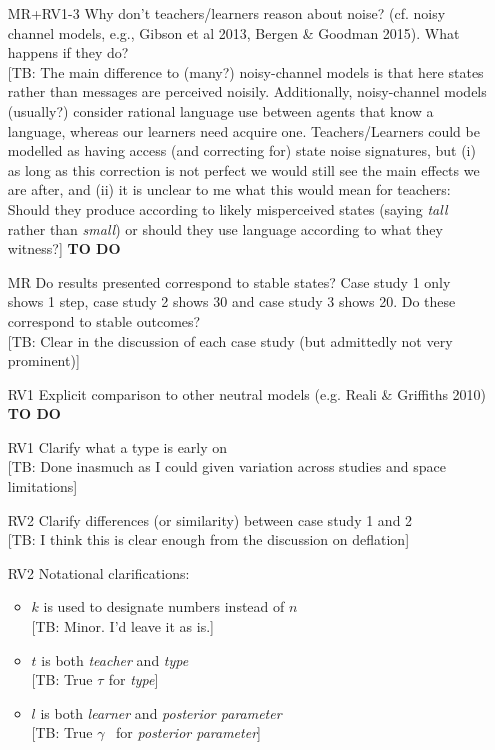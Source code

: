 \documentclass[10pt,a4paper]{article}
\newcommand{\tb}[1]{\textcolor[rgb]{.8,.33,.0}{[TB: #1]}}%
\newcommand{\type}[1]{\ensuremath{\tau_{#1}}}
\newcommand{\postparameter}{\ensuremath{\gamma}}
\begin{document}
  \begin{itemize}
    \item [MR+RV1-3] Why don't teachers/learners reason about noise? (cf. noisy channel models, e.g., Gibson et al 2013, Bergen \& Goodman 2015). What happens if they do?\\ \tb{The main difference to (many?) noisy-channel models is that here states rather than messages are perceived noisily. Additionally, noisy-channel models (usually?) consider rational language use between agents that know a language, whereas our learners need acquire one. Teachers/Learners could be modelled as having access (and correcting for) state noise signatures, but (i) as long as this correction is not perfect we would still see the main effects we are after, and (ii) it is unclear to me what this would mean for teachers: Should they produce according to likely misperceived states (saying {\em tall} rather than {\em small}) or should they use language according to what they witness?} {\bf TO DO}
    \item [MR] Do results presented correspond to stable states? Case study 1 only shows 1 step, case study 2 shows 30 and case study 3 shows 20. Do these correspond to stable outcomes?\\ \tb{Clear in the discussion of each case study (but admittedly not very prominent)}
    \item [RV1] Explicit comparison to other neutral models (e.g. Reali \& Griffiths 2010) {\bf TO DO}
    \item [RV1] Clarify what a type is early on\\ \tb{Done inasmuch as I could given variation across studies and space limitations}
    \item [RV2] Clarify differences (or similarity) between case study 1 and 2\\\tb{I think this is clear enough from the discussion on deflation}
    \item [RV2] Notational clarifications:
      \begin{itemize}
	\item $k$ is used to designate numbers instead of $n$\\ \tb{Minor. I'd leave it as is.}
	\item $t$ is both {\em teacher} and {\em type}\\ \tb{True \type{} for {\em type}}
	\item $l$ is both {\em learner} and {\em posterior parameter}\\ \tb{True \postparameter~ for {\em posterior parameter}}

\end{itemize}
\end{itemize}
\end{document}
